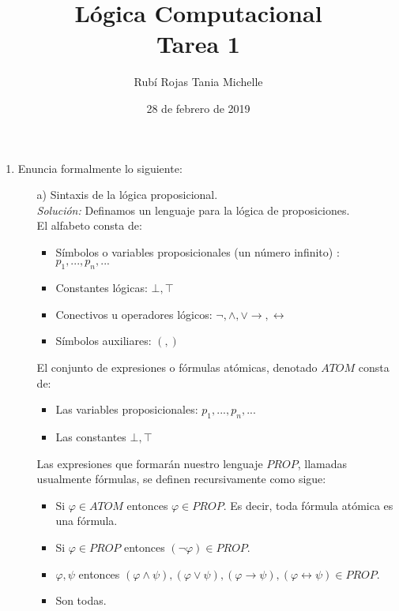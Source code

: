 \documentclass[letterpaper,11pt]{article}
\title{Lógica Computacional \\ Tarea 1}
\author{Rubí Rojas Tania Michelle}
\date{28 de febrero de 2019}
\begin{document}
    \maketitle

    \begin{enumerate}
        
        \item Enuncia formalmente lo siguiente:
        \begin{itemize}

            \item[a)] Sintaxis de la lógica proposicional. \\
            \textit{Solución:} Definamos un lenguaje para la lógica de
            proposiciones.  \\
            El alfabeto consta de:

            \begin{itemize}
                \item Símbolos o variables proposicionales (un número
                infinito) : $p_{1}, ... , p_{n}, ...$
                \item Constantes lógicas: $\bot, \top$
                \item Conectivos u operadores lógicos: $\neg, \land, \lor 
                \rightarrow, \leftrightarrow$
                \item Símbolos auxiliares: $(,)$
            \end{itemize}

            El conjunto de expresiones o fórmulas atómicas, denotado
            $ATOM$ consta de:

            \begin{itemize}
                \item Las variables proposicionales: $p_{1}, ..., p_{n}, ...$
                \item Las constantes $\bot, \top$
            \end{itemize}

            Las expresiones que formarán nuestro lenguaje $PROP$, llamadas
            usualmente fórmulas, se definen recursivamente como sigue:

            \begin{itemize}
                \item Si $\varphi \in ATOM$ entonces $\varphi \in PROP$. Es 
                decir, toda fórmula atómica es una fórmula.
                \item Si $\varphi \in PROP$ entonces 
                $(\neg \varphi) \in PROP$.
                \item $\varphi, \psi$ entonces $(\varphi \land \psi), 
                (\varphi \lor \psi), (\varphi \rightarrow \psi), 
                (\varphi \leftrightarrow \psi) \in PROP$.
                \item Son todas.
            \end{itemize}


\end{itemize}
\end{enumerate}
\end{document}
